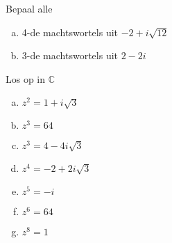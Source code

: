\documentclass[12pt,twoside]{article}
\begin{document}
\begin{oefening}
Bepaal alle
\begin{enumerate}[(a)]
  \itemsep.5em
  \item 4-de machtswortels uit $-2+i\sqrt{12}$
  \item 3-de machtswortels uit $2-2i$
\end{enumerate}
\end{oefening}

\begin{oefening}
Los op in $\mathbb{C}$
\begin{enumerate}[(a)]
  \itemsep.5em
  \item $\displaystyle z^2=1+i\sqrt{3}$
  \item $\displaystyle z^3=64$
  \item $\displaystyle z^3=4-4i\sqrt{3}$
  \item $\displaystyle z^4=-2+2i\sqrt{3}$
  \item $\displaystyle z^5=-i$
  \item $\displaystyle z^6=64$
  \item $\displaystyle z^8=1$
\end{enumerate}
\end{oefening}
\end{document}
